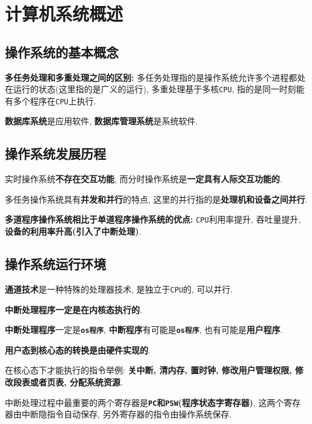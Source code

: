 \chapter{计算机系统概述}
\section{操作系统的基本概念}
\textbf{多任务处理和多重处理之间的区别:} 多任务处理指的是操作系统允许多个进程都处在运行的状态(这里指的是广义的运行), 多重处理基于多核\verb|CPU|, 指的是同一时刻能有多个程序在\verb|CPU|上执行.\par \vspace{.5em}
\textbf{数据库系统}是应用软件, \textbf{数据库管理系统}是系统软件.
\section{操作系统发展历程}
实时操作系统\textbf{不存在交互功能}, 而分时操作系统是\textbf{一定具有人际交互功能的}.\par \vspace{.5em}
多任务操作系统具有\textbf{并发和并行}的特点, 这里的并行指的是\textbf{处理机和设备之间并行}.\par \vspace{.5em}
\textbf{多道程序操作系统相比于单道程序操作系统的优点:} \verb|CPU|利用率提升, 吞吐量提升, \textbf{设备的利用率升高(引入了中断处理)}.
\section{操作系统运行环境}
\textbf{通道技术}是一种特殊的处理器技术, 是独立于\verb|CPU|的, 可以并行.\par \vspace{.5em}
\textbf{中断处理程序一定是在内核态执行的}. \par \vspace{.5em}
\textbf{中断处理程序}一定是\textbf{\texttt{os程序}}, \textbf{中断程序}有可能是\textbf{\texttt{os程序}}, 也有可能是\textbf{用户程序}.\par \vspace{.5em}
\textbf{用户态到核心态的转换是由硬件实现的}. \par \vspace{.5em}
在核心态下才能执行的指令举例: \textbf{关中断, 清内存, 置时钟, 修改用户管理权限, 修改段表或者页表, 分配系统资源}.\par \vspace{.5em}
中断处理过程中最重要的两个寄存器是\textbf{\texttt{PC}和\texttt{PSW}(程序状态字寄存器)}, 这两个寄存器由中断隐指令自动保存, 另外寄存器的指令由操作系统保存.
